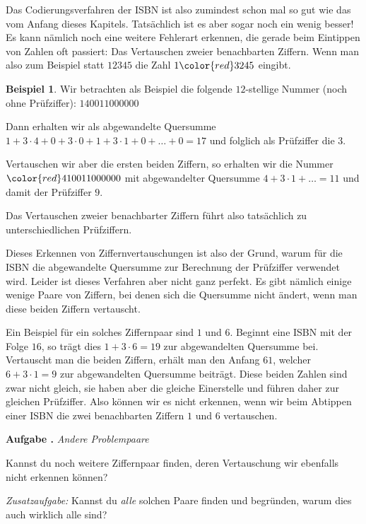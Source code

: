 \documentclass[a4paper,ngerman,12pt]{scrartcl}
\newcommand{\red}[1]{{\color{red}#1}}
\theoremstyle{definition}
\newtheorem{bsp}[defn]{Beispiel}
\theoremstyle{plain}
\theoremstyle{remark}
\newlength{\aufgabenskip}
\newcounter{aufgabennummer}
\newenvironment{aufgabe}[1]{
	\addtocounter{aufgabennummer}{1}
	\textbf{Aufgabe \theaufgabennummer.} \emph{#1} \par
}{\vspace{\aufgabenskip}}
\begin{document}
Das Codierungsverfahren der ISBN ist also zumindest schon mal so gut wie das vom Anfang dieses Kapitels. Tatsächlich ist es aber sogar noch ein wenig besser! Es kann nämlich noch eine weitere Fehlerart erkennen, die gerade beim Eintippen von Zahlen oft passiert: Das Vertauschen zweier benachbarten Ziffern. Wenn man also zum Beispiel statt $12345$ die Zahl $1\red{32}45$ eingibt.

\begin{bsp}
	Wir betrachten als Beispiel die folgende $12$-stellige Nummer (noch ohne Prüfziffer): $140011000000$
	
	Dann erhalten wir als abgewandelte Quersumme $1+3\cdot 4+0+3\cdot 0+1+3\cdot 1+ 0+\dots +0=17$ und folglich als Prüfziffer die $3$.
	
	Vertauschen wir aber die ersten beiden Ziffern, so erhalten wir die Nummer $\red{41}0011000000$ mit abgewandelter Quersumme $4+3\cdot 1 + \dots = 11$ und damit der Prüfziffer $9$.
	
	Das Vertauschen zweier benachbarter Ziffern führt also tatsächlich zu unterschiedlichen Prüfziffern.
\end{bsp}

Dieses Erkennen von Ziffernvertauschungen ist also der Grund, warum für die ISBN die abgewandelte Quersumme zur Berechnung der Prüfziffer verwendet wird. Leider ist dieses Verfahren aber nicht ganz perfekt. Es gibt nämlich einige wenige Paare von Ziffern, bei denen sich die Quersumme nicht ändert, wenn man diese beiden Ziffern vertauscht. 

Ein Beispiel für ein solches Ziffernpaar sind $1$ und $6$. Beginnt eine ISBN mit der Folge $16$, so trägt dies $1+3\cdot 6=19$  zur abgewandelten Quersumme bei. Vertauscht man die beiden Ziffern, erhält man den Anfang $61$, welcher $6+3\cdot 1=9$ zur abgewandelten Quersumme beiträgt. Diese beiden Zahlen sind zwar nicht gleich, sie haben aber die gleiche Einerstelle und führen daher zur gleichen Prüfziffer. Also können wir es nicht erkennen, wenn wir beim Abtippen einer ISBN die zwei benachbarten Ziffern $1$ und $6$ vertauschen.

\begin{aufgabe}{Andere Problempaare}
	Kannst du noch weitere Ziffernpaar finden, deren Vertauschung wir ebenfalls nicht erkennen können?
	
	\emph{Zusatzaufgabe:} Kannst du \emph{alle} solchen Paare finden und begründen, warum dies auch wirklich alle sind?
\end{aufgabe}


\end{document}
